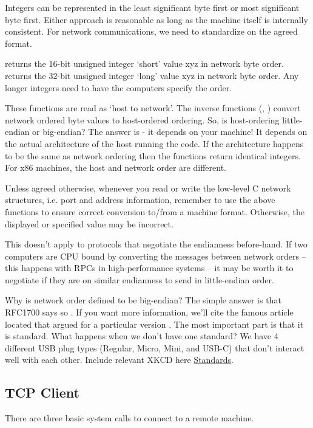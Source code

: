 Integers can be represented in the least significant byte first or most significant byte first.
Either approach is reasonable as long as the machine itself is internally consistent.
For network communications, we need to standardize on the agreed format.

 returns the 16-bit unsigned integer `short' value xyz in network byte order.
 returns the 32-bit unsigned integer `long' value xyz in network byte order.
Any longer integers need to have the computers specify the order.

These functions are read as `host to network'.
The inverse functions (, ) convert network ordered byte values to host-ordered ordering.
So, is host-ordering little-endian or big-endian?
The answer is - it depends on your machine!
It depends on the actual architecture of the host running the code.
If the architecture happens to be the same as network ordering then the functions return identical integers.
For x86 machines, the host and network order are different.

Unless agreed otherwise, whenever you read or write the low-level C network structures, i.e. port and address information, remember to use the above functions to ensure correct conversion to/from a machine format.
Otherwise, the displayed or specified value may be incorrect.

This doesn't apply to protocols that negotiate the endianness before-hand.
If two computers are CPU bound by converting the messages between network orders -- this happens with RPCs in high-performance systems -- it may be worth it to negotiate if they are on similar endianness to send in little-endian order.

Why is network order defined to be big-endian?
The simple answer is that RFC1700 says so \cite{RFC1700}.
If you want more information, we'll cite the famous article located that argued for a particular version \cite{cohen_1980}.
The most important part is that it is standard.
What happens when we don't have one standard?
We have 4 different USB plug types (Regular, Micro, Mini, and USB-C) that don't interact well with each other.
Include relevant XKCD here \href{https://xkcd.com/927/}{Standards}.

\subsection{TCP Client}

There are three basic system calls to connect to a remote machine.

